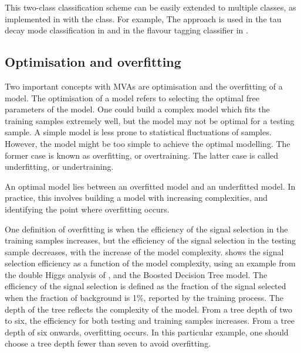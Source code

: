 
This two-class classification scheme can  be easily extended to multiple classes, as implemented in \TMVA with the \multiclass class. For example, The \multiclass approach is used in the tau decay mode classification in  and in the flavour tagging classifier in .


\subsection{Optimisation and overfitting}
\label{sec:pandoraMVAoptimisation}

Two important concepts with MVAs are optimisation and the overfitting of a model. The optimisation of a model refers to selecting the optimal free parameters of the model. One could build a complex model which fits the training samples extremely well, but the model may not be optimal for a testing sample. A simple model is less prone to statistical fluctuations of samples. However, the model might be too simple to achieve the optimal modelling. The former case is known as overfitting, or overtraining. The latter case is called underfitting, or undertraining.


An optimal model lies between an overfitted model and an underfitted model. In practice, this involves building a model with increasing complexities, and identifying the point where overfitting occurs.

One definition of  overfitting is when the efficiency of the signal selection in the training samples increases, but the efficiency of the signal selection in the testing sample decreases, with the increase of the model complexity.  shows the signal selection efficiency as a function of the model complexity, using an example from the double Higgs analysis of , and the Boosted Decision Tree model. The efficiency of the signal selection is defined as the  fraction of the signal selected when the fraction of background  is 1\%, reported by the \TMVA training process. The depth of the tree  reflects the complexity of the model. From a tree depth of two to six, the efficiency for both testing and training samples increases. From a tree depth of six onwards, overfitting occurs. In this particular example, one should choose a tree depth fewer than seven to avoid overfitting.

